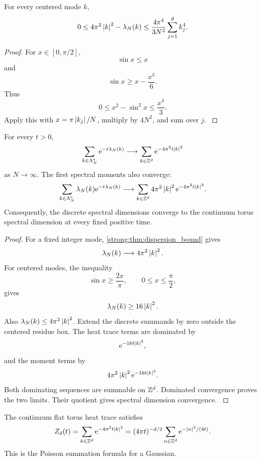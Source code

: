 \begin{theorem}\label{strong:theorem:039}\label{strong:thm:dispersion_bound}
For every centered mode \(k\),
\[
0
\leq
4\pi^2\left\lvert k\right\rvert^2-\lambda_N(k)
\leq
\frac{4\pi^4}{3N^2}
\sum_{j=1}^{d}k_j^4.
\]
\end{theorem}

\begin{proof}\label{strong:proof:064}
For \(x\in[0,\pi/2]\),
\[
\sin x\leq x
\]
and
\[
\sin x\geq x-\frac{x^3}{6}.
\]
Thus
\[
0\leq x^2-\sin^2x\leq\frac{x^4}{3}.
\]
Apply this with \(x=\pi\left\lvert k_j\right\rvert/N\), multiply by \(4N^2\), and sum over \(j\).
\label{strong:proof:064:end}\end{proof}

\begin{theorem}\label{strong:theorem:040}\label{strong:thm:heat_trace_convergence}
For every \(t>0\),
\[
\sum_{k\in\Lambda_N^*}
\e^{-t\lambda_N(k)}
\longrightarrow
\sum_{k\in\ZZ^d}
\e^{-4\pi^2t\abs{k}^2}
\]
as \(N\to\infty\). The first spectral moments also converge:
\[
\sum_{k\in\Lambda_N^*}
\lambda_N(k)\e^{-t\lambda_N(k)}
\longrightarrow
\sum_{k\in\ZZ^d}
4\pi^2\abs{k}^2\e^{-4\pi^2t\abs{k}^2}.
\]
Consequently, the discrete spectral dimensions converge to the continuum torus spectral dimension at every fixed positive time.
\end{theorem}

\begin{proof}\label{strong:proof:065}
For a fixed integer mode, \cref{strong:thm:dispersion_bound} gives
\[
\lambda_N(k)\longrightarrow4\pi^2\left\lvert k\right\rvert^2.
\]
For centered modes, the inequality
\[
\sin x\geq\frac{2x}{\pi},
\qquad
0\leq x\leq\frac\pi2,
\]
gives
\[
\lambda_N(k)\geq16\left\lvert k\right\rvert^2.
\]
Also \(\lambda_N(k)\leq4\pi^2\left\lvert k\right\rvert^2\). Extend the discrete summands by zero outside the centered residue box. The heat trace terms are dominated by
\[
\e^{-16t\abs{k}^2},
\]
and the moment terms by
\[
4\pi^2\abs{k}^2\e^{-16t\abs{k}^2}.
\]
Both dominating sequences are summable on \(\ZZ^d\). Dominated convergence proves the two limits. Their quotient gives spectral dimension convergence.
\label{strong:proof:065:end}\end{proof}

\begin{standardfact}\label{strong:standardfact:004}\label{strong:fact:theta_transform}
The continuum flat torus heat trace satisfies
\[
Z_d(t)
=
\sum_{k\in\ZZ^d}\e^{-4\pi^2t\abs{k}^2}
=
(4\pi t)^{-d/2}
\sum_{n\in\ZZ^d}\e^{-\abs{n}^2/(4t)}.
\]
This is the Poisson summation formula for a Gaussian.
\end{standardfact}

